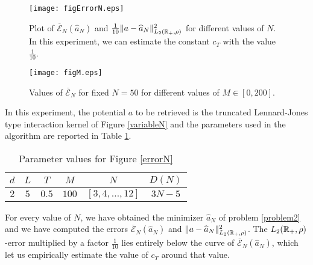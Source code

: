 \begin{figure}[h]
\hspace{-1.2cm}
\begin{minipage}{0.58\textwidth}
\begin{center}
\texttt{[image: figErrorN.eps]}
\end{center}
\caption{Plot of $\overline{\mathcal{E}}_N(\widehat{a}_N)$ and $\frac{1}{10}\|a-\widehat{a}_N\|^2_{L_2(\mathbb{R}_+,\rho)}$ for different values of $N$. In this experiment, we can estimate the constant $c_T$ with the value $\frac{1}{10}$. }\label{errorN}
\end{minipage}
\hspace{0.4cm}
\begin{minipage}{0.55\textwidth}
\begin{center}
\texttt{[image: figM.eps]}
\end{center}
\caption{Values of $\overline{\mathcal{E}}_N$ for fixed $N = 50$ for different values of $M \in [0,200]$.}\label{Mconstr}
\end{minipage}
\end{figure}

In this experiment, the potential $a$ to be retrieved is the truncated Lennard-Jones type interaction kernel of Figure \ref{variableN} and the parameters used in the algorithm are reported in Table \ref{tab:fig3}.

\begin{table}[h]
\begin{center}
\begin{tabular}{ |c|c|c|c|c|c| }
\hline
  $d$ & $L$ & $T$ & $M$ & $N$ & $D(N)$ \\
\hline
\hline
  $2$ & $5$ & $0.5$ & $100$ & $[3,4,\ldots,12]$ & $3N-5$ \\
\hline
\end{tabular}
\end{center}
\vspace{-0.5cm}
\caption{Parameter values for Figure \ref{errorN}} \label{tab:fig3} 
\end{table}

For every value of $N$, we have obtained the minimizer $\widehat{a}_N$ of problem \eqref{problem2} and we have computed the errors $\overline{\mathcal{E}}_N(\widehat{a}_N)$ and $\|a-\widehat{a}_N\|^2_{L_2(\mathbb{R}_+,\rho)}$. The $L_2(\mathbb{R}_+,\rho)$-error multiplied by a factor $\frac{1}{10}$ lies entirely below the curve of $\overline{\mathcal{E}}_N(\widehat{a}_N)$, which let us empirically estimate the value of $c_T$ around that value.

